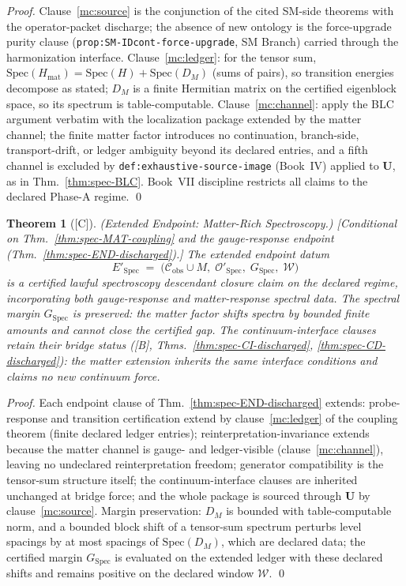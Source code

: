 \documentclass[12pt,oneside]{amsbook}
\theoremstyle{plain}
\newtheorem{theorem}{Theorem}[section]
\theoremstyle{definition}
\theoremstyle{remark}
\newcommand{\status}[1]{\textup{[#1]}}
\begin{document}
\begin{proof}
Clause~\ref{mc:source} is the conjunction of the cited SM-side
theorems with the operator-packet discharge; the absence of new
ontology is the force-upgrade purity clause
(\texttt{prop:SM-IDcont-force-upgrade}, SM Branch) carried through
the harmonization interface.  Clause~\ref{mc:ledger}: for the
tensor sum, $\mathrm{Spec}(H_{\mathrm{mat}}) =
\mathrm{Spec}(H) + \mathrm{Spec}(D_M)$ (sums of pairs), so
transition energies decompose as stated; $D_M$ is a finite
Hermitian matrix on the certified eigenblock space, so its
spectrum is table-computable.  Clause~\ref{mc:channel}: apply the
BLC argument verbatim with the localization package extended by
the matter channel; the finite matter factor introduces no
continuation, branch-side, transport-drift, or ledger ambiguity
beyond its declared entries, and a fifth channel is excluded by
\texttt{def:exhaustive-source-image} (Book~IV) applied to
$\mathbf{U}$, as in Thm.~\ref{thm:spec-BLC}.  Book~VII discipline
restricts all claims to the declared Phase-A regime. \qed
\end{proof}

\begin{theorem}[\status{C}]\label{thm:spec-MAT-endpoint}
\textup{(Extended Endpoint: Matter-Rich Spectroscopy.)}
\textup{[Conditional on Thm.~\ref{thm:spec-MAT-coupling} and the
gauge-response endpoint
(Thm.~\ref{thm:spec-END-discharged}).]}
The extended endpoint datum
\[
  E'_{\mathrm{Spec}} \;=\;
  \bigl(\mathcal{C}_{\mathrm{obs}} \cup M,\;
  \mathcal{O}'_{\mathrm{Spec}},\;
  G_{\mathrm{Spec}},\;
  \mathcal{W}\bigr)
\]
is a certified lawful spectroscopy descendant closure claim on the
declared regime, incorporating both gauge-response and
matter-response spectral data.  The spectral margin
$G_{\mathrm{Spec}}$ is preserved: the matter factor shifts spectra
by bounded finite amounts and cannot close the certified gap.
The continuum-interface clauses retain their bridge status
([B], Thms.~\ref{thm:spec-CI-discharged},
\ref{thm:spec-CD-discharged}): the matter extension inherits the
same interface conditions and claims no new continuum force.
\end{theorem}

\begin{proof}
Each endpoint clause of Thm.~\ref{thm:spec-END-discharged} extends:
probe-response and transition certification extend by
clause~\ref{mc:ledger} of the coupling theorem (finite declared
ledger entries); reinterpretation-invariance extends because the
matter channel is gauge- and ledger-visible
(clause~\ref{mc:channel}), leaving no undeclared reinterpretation
freedom; generator compatibility is the tensor-sum structure
itself; the continuum-interface clauses are inherited unchanged at
bridge force; and the whole package is sourced through $\mathbf{U}$
by clause~\ref{mc:source}.  Margin preservation: $D_M$ is bounded
with table-computable norm, and a bounded block shift of a
tensor-sum spectrum perturbs level spacings by at most spacings of
$\mathrm{Spec}(D_M)$, which are declared data; the certified
margin $G_{\mathrm{Spec}}$ is evaluated on the extended ledger
with these declared shifts and remains positive on the declared
window $\mathcal{W}$. \qed
\end{proof}
\end{document}
